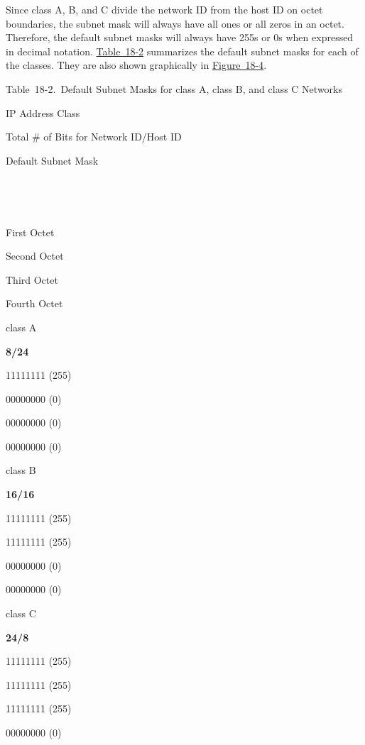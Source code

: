 Since class A, B, and C divide the network ID from the host ID on octet
boundaries, the subnet mask will always have all ones or all zeros in an
octet. Therefore, the default subnet masks will always have 255s or 0s
when expressed in decimal notation.
\protect\hyperlink{ch18s04.htmlux5cux23default_subnet_masks_for_class_a_class_b}{Table~18-2}
summarizes the default subnet masks for each of the classes. They are
also shown graphically in
\protect\hyperlink{ch18s04.htmlux5cux23default_subnet_masks_for_class_a_c-id001}{Figure~18-4}.

\protect\hypertarget{ch18s04.htmlux5cux23default_subnet_masks_for_class_a_class_b}{}{}

Table~18-2.~Default Subnet Masks for class A, class B, and class C
Networks

IP Address Class

Total \# of Bits for Network ID/Host ID

\protect\hypertarget{ch18s04.htmlux5cux23idx-CHP-18-0734}{}{}Default
Subnet Mask

~

~

First Octet

Second Octet

Third Octet

Fourth Octet

class A

{\textbf{8/24}}

11111111 (255)

00000000 (0)

00000000 (0)

00000000 (0)

class B

{\textbf{16/16}}

11111111 (255)

11111111 (255)

00000000 (0)

00000000 (0)

class C

{\textbf{24/8}}

11111111 (255)

11111111 (255)

11111111 (255)

00000000 (0)

\protect\hypertarget{ch18s04.htmlux5cux23default_subnet_masks_for_class_a_c-id001}{}{}

\protect\hypertarget{ch18s04.htmlux5cux23I_mediaobject4_d1e18589}{}{}

